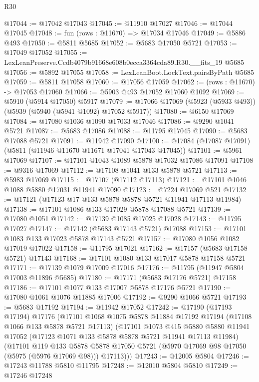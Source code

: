 \begin{lexlean}{R30}
\begin{coremodule}
@17044 := @17042 @17043
@17045 := @11910 @17027
@17046 := @17044 @17045
@17048 := fun (rows : @11670) => @17034 @17046
@17049 := @5886 @493
@17050 := @5811 @5685
@17052 := @5683 @17050 @5721
@17053 := @17049 @17052
@17055 := LexLeanPreserve.Ccdb4079b91668e608b0ecca3364cda89.R30.__fits_19 @5685
@17056 := @5892 @17055
@17058 := LexLeanBoot.LockText.pairsByPath @5685
@17059 := @5811 @17058
@17060 := @17056 @17059
@17062 := (rows : @11670) -> @17053 @17060
@17066 := @5903 @493 @17052 @17060 @1092
@17069 := @5910 (@5914 @17050) @5917
@17079 := @17066 @17069 (@5923 (@5933 @493)) (@5939 (@5940 (@5941 @1092) @17052 @5917))
@17080 := @6150 @17069
@17084 := @17080 @1036 @1090 @17033 @17046
@17086 := @9290 @1041 @5721
@17087 := @5683 @17086
@17088 := @11795 @17045
@17090 := @5683 @17088 @5721
@17091 := @11942 @17090
@17100 := @17084 (@17087 @17091) (@5811 (@11946 @11670 @11671 @17041 @17043 @17045))
@17101 := @5961 @17069
@17107 := @17101 @1043 @1089 @5878 @17032 @17086 @17091
@17108 := @9316 @17069
@17112 := @17108 @1041 @133 @5878 @5721
@17113 := @5983 @17069
@17115 := @17107 (@17112 @17113)
@17121 := @17101 @1046 @1088 @5880 @17031 @11941 @17090
@17123 := @7224 @17069 @521
@17132 := @17121 (@17123 @17 @133 @5878 @5878 @5721 @11941 @17113 @11984)
@17138 := @17101 @1086 @133 @17029 @5878 @17088 @5721
@17139 := @17080 @1051
@17142 := @17139 @1085 @17025 @17028
@17143 := @11795 @17027
@17147 := @17142 (@5683 @17143 @5721) @17088
@17153 := @17101 @1083 @133 @17023 @5878 @17143 @5721
@17157 := @17080 @1056 @1082 @17019 @17022
@17158 := @11795 @17021
@17162 := @17157 (@5683 @17158 @5721) @17143
@17168 := @17101 @1080 @133 @17017 @5878 @17158 @5721
@17171 := @17139 @1079 @17009 @17016
@17176 := @11795 (@11947 @5804 @17003 @11896 @5685)
@17180 := @17171 (@5683 @17176 @5721) @17158
@17186 := @17101 @1077 @133 @17007 @5878 @17176 @5721
@17190 := @17080 @1061 @1076 @11885 @17006
@17192 := @9290 @1066 @5721
@17193 := @5683 @17192
@17194 := @11942 @17052
@17242 := @17190
    (@17193 @17194)
    @17176
    (@17101
      @1068
      @1075
      @5878
      @11884
      @17192
      @17194
      (@17108 @1066 @133 @5878 @5721 @17113)
      (@17101
        @1073
        @415
        @5880
        @5880
        @11941
        @17052
        (@17123 @1071 @133 @5878 @5878 @5721 @11941 @17113 @11984)
        (@17101
          @119
          @133
          @5878
          @5878
          @17050
          @5721
          (@5970 @17069 @98 @17050 (@5975 (@5976 @17069 @98)))
          @17113)))
@17243 := @12005 @5804
@17246 := @17243 @11788 @5810 @11795
@17248 := @12010 @5804 @5810
@17249 := @17246 @17248

\end{coremodule}
\end{lexlean}
